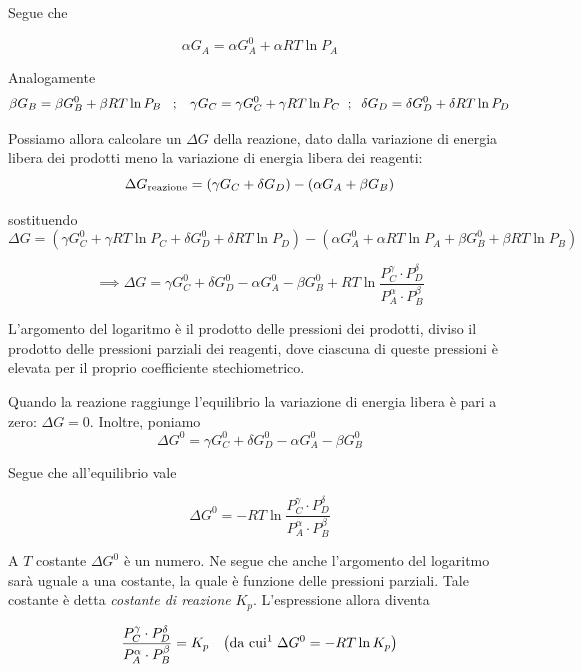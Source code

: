 Segue che

$$ \alpha G_A = \alpha G_A^0  + \alpha RT \ln P_A$$

Analogamente
$$\beta G_B = \beta G_B^0 + \beta RT \ln P_B
\hspace{0.3cm};\hspace{0.3cm}
\gamma G_C = \gamma G_C^0 + \gamma RT \ln P_C
\hspace{0.2cm};\hspace{0.2cm}
\delta G_D = \delta G_D^0 + \delta RT \ln P_D$$

Possiamo allora calcolare un $\Delta G$ della reazione, dato dalla variazione di energia libera dei prodotti meno la variazione di energia libera dei reagenti:
$$\Delta G_{\rm reazione} = (\gamma G_C + \delta G_D) - (\alpha G_A + \beta G_B)$$

sostituendo
$$\Delta G = (\gamma G_C^0  + \gamma RT \ln P_C + \delta G_D^0  + \delta RT \ln P_D) - 
(\alpha G_A^0 + \alpha RT \ln P_A + \beta G_B^0  + \beta RT \ln P_B)$$

$$\implies \Delta G = \gamma G_C^0 + \delta G_D^0 - \alpha G_A^0 - \beta G_B^0 + RT \ln \frac{P_C^{\gamma} \cdot P_D^{\delta}}{P_A^{\alpha} \cdot P_B^{\beta}}$$

L'argomento del logaritmo è il prodotto delle pressioni dei prodotti, diviso il prodotto delle pressioni parziali dei reagenti, dove ciascuna di queste pressioni è elevata per il proprio coefficiente stechiometrico.

Quando la reazione raggiunge l'equilibrio la variazione di energia libera è pari a zero: $\Delta G = 0$. Inoltre, poniamo
$$\Delta G^0 = \gamma G_C^0 + \delta G_D^0 - \alpha G_A^0 - \beta G_B^0 $$

Segue che all'equilibrio vale

$$\Delta G^0 = -RT \ln \frac{P_C^{\gamma} \cdot P_D^{\delta}}{P_A^{\alpha} \cdot P_B^{\beta}}$$

A $T$ costante $\Delta G^0$ è un numero. Ne segue che anche l'argomento del logaritmo sarà uguale a una costante, la quale è funzione delle pressioni parziali. Tale costante è detta \textit{costante di reazione} $K_p$. L'espressione allora diventa

$$\frac{P_C^{\gamma} \cdot P_D^{\delta}}{P_A^{\alpha} \cdot P_B^{\beta}} = K_p
\quad\big(\text{da cui\footnotemark\;}
\Delta G^0 = -RT\ln K_p\big)$$


